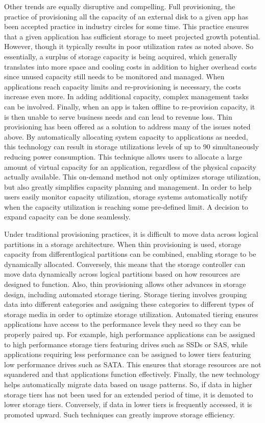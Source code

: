 \documentclass[11pt]{article}
\begin{document}
Other trends are equally disruptive and compelling. Full provisioning, the 
practice of provisioning all the capacity of an external disk to a given app 
has been accepted practice in industry circles for some time. This practice 
ensures that a given application has sufficient storage to meet projected 
growth potential. However, though it typically results in poor utilization 
rates as noted above. So essentially, a surplus of storage capacity is being 
acquired, which generally translates into more space and cooling costs in 
addition to higher overhead costs since unused capacity still needs to be 
monitored and managed. When applications reach capacity limits and 
re-provisioning is necessary, the costs increase even more. In adding 
additional capacity, complex management tasks can be involved. Finally, when 
an app is taken offline to re-provision capacity, it is then unable to serve 
business needs and can lead to revenue loss. Thin provisioning has been 
offered as a solution to address many of the issues noted above. By 
automatically allocating system capacity to applications as needed, this 
technology can result in storage utilizations levels of up to 90%
simultaneously reducing power consumption. This technique allows users to 
allocate a large amount of virtual capacity for an application, regardless 
of the physical capacity actually available. This on-demand method not only 
optimizes storage utilization, but also greatly simplifies capacity planning 
and management. In order to help users easily monitor capacity utilization, 
storage systems automatically notify when the capacity utilization is reaching 
some pre-defined limit. A decision to expand capacity can be done seamlessly. 

Under traditional provisioning practices, it is difficult to move data 
across logical partitions in a storage architecture. When thin provisioning 
is used, storage capacity from differentlogical partitions can be combined, 
enabling storage to be dynamically allocated. Conversely, this means that the 
storage controller can move data dynamically across logical partitions based 
on how resources are designed to function. Also, thin provisioning allows 
other advances in storage design, including automated storage tiering. Storage 
tiering involves grouping data into different categories and assigning these 
categories to different types of storage media in order to optimize storage 
utilization. Automated tiering ensures applications have access to the 
performance levels they need so they can be properly paired up. For example, 
high performance applications can be assigned to high performance storage 
tiers featuring drives such as SSDs or SAS, while applications requiring less 
performance can be assigned to lower tiers featuring low performance drives 
such as SATA. This ensures that storage resources are not squandered and that 
applications function effectively. Finally, the new technology helps 
automatically migrate data based on usage patterns. So, if data in higher 
storage tiers has not been used for an extended period of time, it is demoted 
to lower storage tiers. Conversely, if data in lower tiers is frequently 
accessed, it is promoted upward. Such techniques can greatly improve storage 
efficiency.
\end{document}

